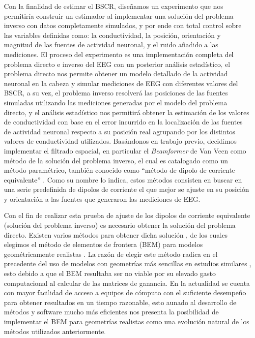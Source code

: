 Con la finalidad de estimar el BSCR, diseñamos un experimento que nos permitiría construir un estimador al implementar una solución del problema inverso con datos completamente simulados, y por ende con total control sobre las variables definidas como: la conductividad, la posición, orientación y magnitud de las fuentes de actividad neuronal, y el ruido añadido a las mediciones. El proceso del experimento es una implementación completa del problema directo e inverso del EEG con un posterior análisis estadístico, el problema directo nos permite obtener un modelo detallado de la actividad neuronal en la cabeza y simular mediciones de EEG con diferentes valores del BSCR, a su vez, el problema inverso resolverá las posiciones de las fuentes simuladas utilizando las mediciones generadas por el modelo del problema directo, y el análisis estadístico nos permitirá obtener la estimación de los valores de conductividad con base en el error incurrido en la localización de las fuentes de actividad neuronal respecto a su posición real agrupando por los distintos valores de conductividad utilizados. Basándonos en trabajo previo, decidimos implementar el filtrado espacial, en particular el \emph{Beamformer} de Van Veen \cite{VanVeen1988} como método de la solución del problema inverso, el cual es catalogado como un método paramétrico, también conocido como ``método de dipolo de corriente equivalente'' \cite{Grech2008}. Como su nombre lo indica, estos métodos consisten en buscar en una serie predefinida de dipolos de corriente el que mejor se ajuste en su posición y orientación a las fuentes que generaron las mediciones de EEG. 

Con el fin de realizar esta prueba de ajuste de los dipolos de corriente equivalente (solución del problema inverso) es necesario obtener la solución del problema directo. Existen varios métodos para obtener dicha solución \cite{Mosher1999}, de los cuales elegimos el método de elementos de frontera (BEM) para modelos geométricamente realistas \cite{Ermer2001}. La razón de elegir este método radica en el precedente del uso de modelos con geometrías más sencillas en estudios similares \cite{Gutierrez2004}, esto debido a que el BEM resultaba ser no viable por su elevado gasto computacional al calcular de las matrices de ganancia. En la actualidad se cuenta con mayor facilidad de acceso a equipos de cómputo con el suficiente desempeño para obtener resultados en un tiempo razonable, esto aunado al desarrollo de métodos y software mucho más eficientes \cite{open,Clerc2010} nos presenta la posibilidad de implementar el BEM para geometrías realistas como una evolución natural de los métodos utilizados anteriormente.

